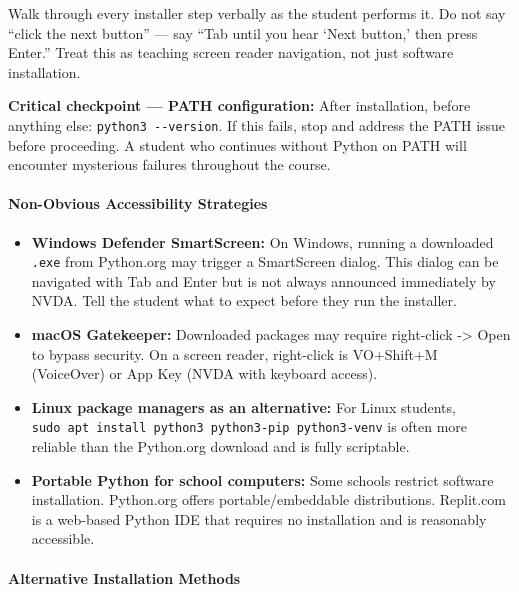 \documentclass[
  justified,
  openright,
]{tufte-book}
\let\paragraph\paragraph
\let\paragraph\paragraph
\providecommand{\tightlist}{%
  \setlength{\itemsep}{0pt}\setlength{\parskip}{0pt}}
\begin{document}
Walk through every installer step verbally as the student performs it.
Do not say ``click the next button'' --- say ``Tab until you hear `Next
button,' then press Enter.'' Treat this as teaching screen reader
navigation, not just software installation.

\textbf{Critical checkpoint --- PATH configuration:} After installation,
before anything else: \texttt{python3\ -\/-version}. If this fails, stop
and address the PATH issue before proceeding. A student who continues
without Python on PATH will encounter mysterious failures throughout the
course.

\paragraph{Non-Obvious Accessibility
Strategies}\label{non-obvious-accessibility-strategies}

\begin{itemize}
\tightlist
\item
  \textbf{Windows Defender SmartScreen:} On Windows, running a
  downloaded \texttt{.exe} from Python.org may trigger a SmartScreen
  dialog. This dialog can be navigated with Tab and Enter but is not
  always announced immediately by NVDA. Tell the student what to expect
  before they run the installer.
\item
  \textbf{macOS Gatekeeper:} Downloaded packages may require right-click
  -\textgreater{} Open to bypass security. On a screen reader,
  right-click is VO+Shift+M (VoiceOver) or App Key (NVDA with keyboard
  access).
\item
  \textbf{Linux package managers as an alternative:} For Linux students,
  \texttt{sudo\ apt\ install\ python3\ python3-pip\ python3-venv} is
  often more reliable than the Python.org download and is fully
  scriptable.
\item
  \textbf{Portable Python for school computers:} Some schools restrict
  software installation. Python.org offers portable/embeddable
  distributions. Replit.com is a web-based Python IDE that requires no
  installation and is reasonably accessible.
\end{itemize}

\paragraph{Alternative Installation
Methods}\label{alternative-installation-methods}
\end{document}
